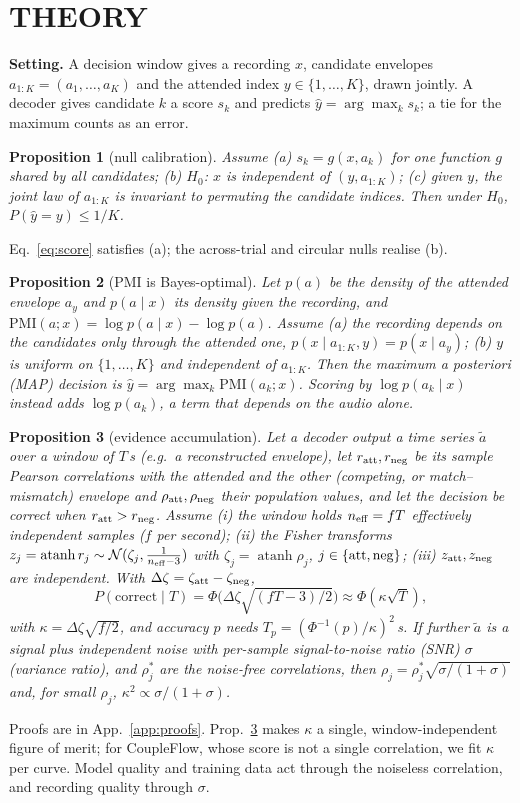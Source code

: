 \documentclass[twoside]{article}
\newtheorem{proposition}{Proposition}
\newcommand{\PMI}{\mathrm{PMI}}
\begin{document}
\section{THEORY}\label{sec:theory}
\textbf{Setting.} A decision window gives a recording $x$, candidate envelopes
$a_{1:K}=(a_1,\dots,a_K)$ and the attended index $y\in\{1,\dots,K\}$, drawn jointly. A
decoder gives candidate $k$ a score $s_k$ and predicts $\hat y=\arg\max_k s_k$; a tie for the
maximum counts as an error.
\begin{proposition}[null calibration]\label{prop:null}
Assume (a) $s_k=g(x,a_k)$ for one function $g$ shared by all candidates; (b) $H_0$: $x$ is
independent of $(y,a_{1:K})$; (c) given $y$, the joint law of $a_{1:K}$ is invariant to
permuting the candidate indices. Then under $H_0$, $P(\hat y=y)\le 1/K$.
\end{proposition}
Eq.~\ref{eq:score} satisfies (a); the across-trial and circular nulls realise (b).
\begin{proposition}[PMI is Bayes-optimal]\label{prop:pmi}
Let $p(a)$ be the density of the attended envelope $a_y$ and $p(a\mid x)$ its density given
the recording, and $\PMI(a;x)=\log p(a\mid x)-\log p(a)$. Assume (a) the recording depends on
the candidates only through the attended one, $p(x\mid a_{1:K},y)=p(x\mid a_y)$; (b) $y$ is
uniform on $\{1,\dots,K\}$ and independent of $a_{1:K}$. Then the maximum a posteriori
(MAP) decision is $\hat y=\arg\max_k\PMI(a_k;x)$. Scoring by $\log p(a_k\mid x)$ instead adds
$\log p(a_k)$, a term that depends on the audio alone.
\end{proposition}
\begin{proposition}[evidence accumulation]\label{prop:law}
Let a decoder output a time series $\tilde a$ over a window of $T$\,s (e.g.\ a reconstructed
envelope), let $r_{\rm att},r_{\rm neg}$ be its sample Pearson correlations with the attended and
the other (competing, or match--mismatch) envelope and $\rho_{\rm att},\rho_{\rm neg}$ their
population values, and let the decision be correct when $r_{\rm att}>r_{\rm neg}$. Assume (i)
the window holds $n_{\rm eff}=fT$ effectively independent samples ($f$ per second); (ii) the
Fisher transforms $z_j=\operatorname{atanh}r_j\sim\mathcal N(\zeta_j,\frac{1}{n_{\rm eff}-3})$ with
$\zeta_j=\operatorname{atanh}\rho_j$, $j\in\{{\rm att},{\rm neg}\}$; (iii) $z_{\rm att},z_{\rm neg}$
are independent. With $\Delta\zeta=\zeta_{\rm att}-\zeta_{\rm neg}$,
\[P(\mathrm{correct}\mid T)=\Phi\big(\Delta\zeta\sqrt{(fT-3)/2}\big)\approx\Phi(\kappa\sqrt T),\]
with $\kappa=\Delta\zeta\sqrt{f/2}$, and accuracy $p$ needs $T_p=(\Phi^{-1}(p)/\kappa)^2$\,s. If further $\tilde a$ is a signal plus
independent noise with per-sample signal-to-noise ratio (SNR) $\sigma$ (variance ratio), and $\rho^\ast_j$
are the noise-free correlations, then $\rho_j=\rho^\ast_j\sqrt{\sigma/(1+\sigma)}$ and, for
small $\rho_j$, $\kappa^2\propto\sigma/(1+\sigma)$.
\end{proposition}
Proofs are in App.~\ref{app:proofs}. Prop.~\ref{prop:law} makes $\kappa$ a single,
window-independent figure of merit; for CoupleFlow, whose score is not a single
correlation, we fit $\kappa$ per curve. Model quality and training data act through the
noiseless correlation, and recording quality through $\sigma$.
\end{document}
